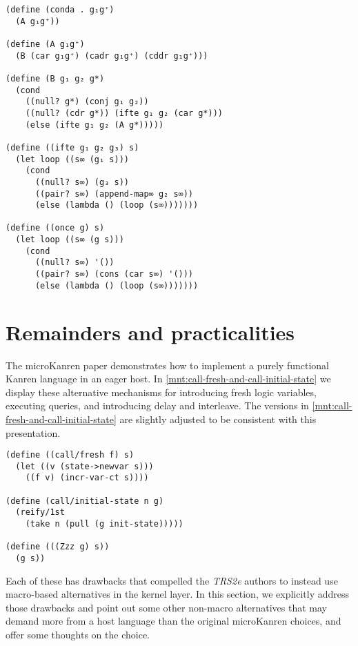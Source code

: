 \documentclass[sigplan,balance,pbalance,natbib=false]{acmart}
\begin{document}
\begin{listing}[h]
  \begin{verbatim}
(define (conda . g₁g⁺)
  (A g₁g⁺))

(define (A g₁g⁺)
  (B (car g₁g⁺) (cadr g₁g⁺) (cddr g₁g⁺)))

(define (B g₁ g₂ g*)
  (cond
    ((null? g*) (conj g₁ g₂))
    ((null? (cdr g*)) (ifte g₁ g₂ (car g*)))
    (else (ifte g₁ g₂ (A g*)))))

(define ((ifte g₁ g₂ g₃) s)
  (let loop ((s∞ (g₁ s)))
    (cond
      ((null? s∞) (g₃ s))
      ((pair? s∞) (append-map∞ g₂ s∞))
      (else (lambda () (loop (s∞)))))))

(define ((once g) s)
  (let loop ((s∞ (g s)))
    (cond
      ((null? s∞) '())
      ((pair? s∞) (cons (car s∞) '()))
      (else (lambda () (loop (s∞)))))))
  \end{verbatim}
  \caption{A functional , , and }\label{mnt:conda-implementation}
\end{listing}

\section{Remainders and practicalities}\label{sec:functional}

The \citeyear{hemann2013muKanren} microKanren paper demonstrates how
to implement a purely functional Kanren language in an eager host. In
\cref{mnt:call-fresh-and-call-initial-state} we display these
alternative mechanisms for introducing fresh logic variables,
executing queries, and introducing delay and interleave. The versions
in \cref{mnt:call-fresh-and-call-initial-state} are slightly adjusted
to be consistent with this presentation.

\begin{listing}
  \begin{verbatim}
(define ((call/fresh f) s)
  (let ((v (state->newvar s)))
    ((f v) (incr-var-ct s))))

(define (call/initial-state n g)
  (reify/1st
    (take n (pull (g init-state)))))

(define (((Zzz g) s))
  (g s))
  \end{verbatim}
  \caption{Functional microKanren equivalents of \emph{TRS2e} kernel macros}\label{mnt:call-fresh-and-call-initial-state}
\end{listing}

Each of these has drawbacks that compelled the \emph{TRS2e} authors to
instead use macro-based alternatives in the kernel layer. In this
section, we explicitly address those drawbacks and point out some
other non-macro alternatives that may demand more from a host language
than the original microKanren choices, and offer some thoughts on the
choice.
\end{document}
